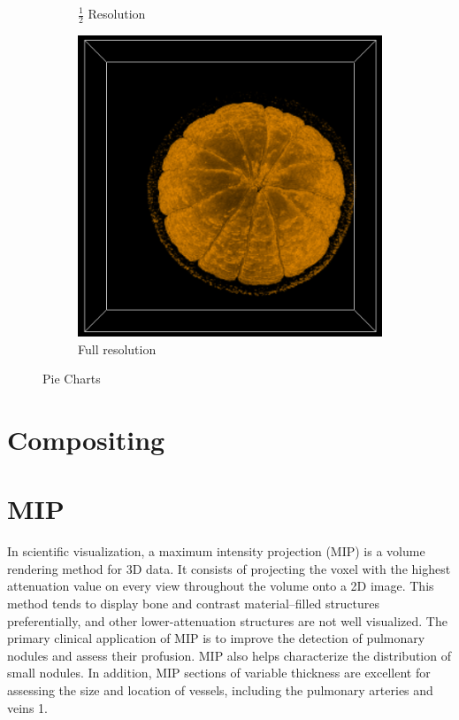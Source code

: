 \documentclass[a4paper,twoside,11pt]{article}
\begin{document}
\begin{figure}[h]
\begin{center}
\begin{subfigure}[b]{0.23\textwidth}
                \caption{$\frac{1}{2}$ Resolution}
                \label{fig:res2}
        \end{subfigure}
        \begin{subfigure}[b]{0.23\textwidth}
                \includegraphics[width=\textwidth]{Images/res1.png}
                \caption{Full resolution}
                \label{fig:res1}
        \end{subfigure}
        \caption{Pie Charts}\label{fig:Resolutions}
\end{center}
\end{figure}


\section{Compositing}
\newpage
\section{MIP}
In scientific visualization, a maximum intensity projection (MIP) is a volume rendering method for 3D data. It consists of projecting the voxel with the highest attenuation value on every view throughout the volume onto a 2D image. \newline
This method tends to display bone and contrast material–filled structures preferentially, and other lower-attenuation structures are not well visualized. The primary clinical application of MIP is to improve the detection of pulmonary nodules and assess their profusion. MIP also helps characterize the distribution of small nodules. In addition, MIP sections of variable thickness are excellent for assessing the size and location of vessels, including the pulmonary arteries and veins 1.
\end{document}
